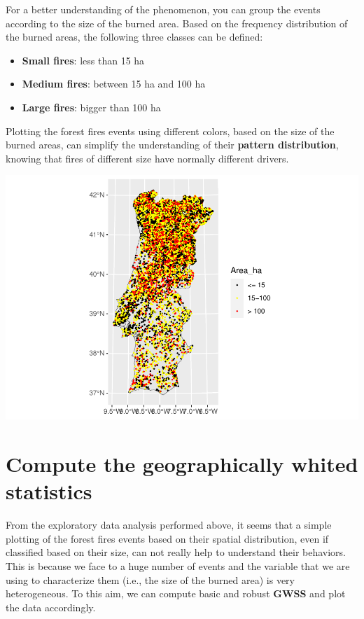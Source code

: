 \documentclass[
]{book}
\begin{document}
For a better understanding of the phenomenon, you can group the events according to the size of the burned area.
Based on the frequency distribution of the burned areas, the following three classes can be defined:

\begin{itemize}
\item
  \textbf{Small fires}: less than 15 ha
\item
  \textbf{Medium fires}: between 15 ha and 100 ha
\item
  \textbf{Large fires}: bigger than 100 ha
\end{itemize}

Plotting the forest fires events using different colors, based on the size of the burned areas, can simplify the understanding of their \textbf{pattern distribution}, knowing that fires of different size have normally different drivers.

\includegraphics{02-GWSS_files/figure-latex/plot-all-fires-1.pdf}

\hypertarget{compute-the-geographically-whited-statistics}{%
\section{Compute the geographically whited statistics}\label{compute-the-geographically-whited-statistics}}

From the exploratory data analysis performed above, it seems that a simple plotting of the forest fires events based on their spatial distribution, even if classified based on their size, can not really help to understand their behaviors.
This is because we face to a huge number of events and the variable that we are using to characterize them (i.e., the size of the burned area) is very heterogeneous.
To this aim, we can compute basic and robust \textbf{GWSS} and plot the data accordingly.
\end{document}
